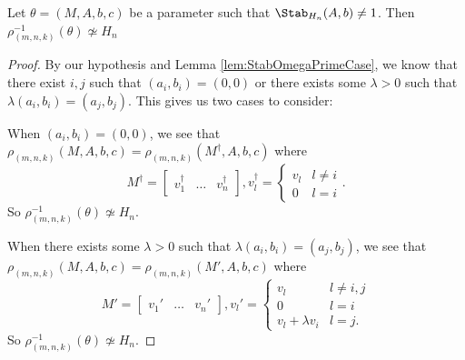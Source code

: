\documentclass[11pt,letterpaper]{amsart}
\begin{document}
\begin{corollary}\label{cor:StabilizerAbAndFibre}
    Let $\theta = (M, A, b, c)$ be a parameter such that $\Stab_{H_n}(A,b)\neq 1$. Then $\rho_{(m,n,k)}^{-1}(\theta)\not\simeq H_n$
\end{corollary}
\begin{proof}
    By our hypothesis and Lemma \ref{lem:StabOmegaPrimeCase}, we know that there exist $i, j$ such that $(a_i, b_i)=(0,0)$ or there exists some $\lambda>0$ such that $\lambda(a_i,b_i)=(a_j, b_j)$. This gives us two cases to consider:
    \par When $(a_i,b_i)=(0,0)$, we see that $\rho_{(m,n,k)}(M, A, b, c) = \rho_{(m,n,k)}(M^\dagger, A, b, c)$ where 
    $$
    M^\dagger = \begin{bmatrix}
        v_1^\dagger & \ldots & v_n^\dagger
    \end{bmatrix}, v_l^\dagger = \begin{cases}
        v_l & l\neq i \\ 0  & l=i
    \end{cases}.
    $$
    So $\rho_{(m,n,k)}^{-1}(\theta)\not\simeq H_n$.
    \par When there exists some $\lambda>0$ such that $\lambda(a_i,b_i)=(a_j, b_j)$, we see that $\rho_{(m,n,k)}(M, A, b, c) = \rho_{(m,n,k)}(M', A, b, c)$ where 
    $$
    M' = \begin{bmatrix}
        v_1' & \ldots & v_n'
    \end{bmatrix}, v_l' = \begin{cases}
        v_l & l\neq i,j \\ 0  & l=i \\ v_l + \lambda v_i & l = j.
    \end{cases}
    $$
    So $\rho_{(m,n,k)}^{-1}(\theta)\not\simeq H_n$.
\end{proof}
\end{document}
